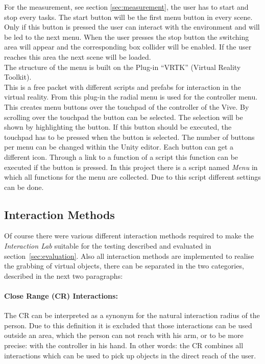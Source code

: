 For the measurement, see section \ref{sec:measurement}, the user has to start and stop every tasks. The start button will be the first menu button in every scene. Only if this button is pressed the user can interact with the environment and will be led to the next menu. When the user presses the stop button the switching area will appear and the corresponding box collider will be enabled. If the user reaches this area the next scene will be loaded.\\
The structure of the menu is built on the Plug-in ``VRTK'' (Virtual Reality Toolkit). \cite{asset_VRTK} \cite{VRTK}\\
This is a free packet with different scripts and prefabs for interaction in the virtual reality. From this plug-in the radial menu is used for the controller menu. This creates menu buttons over the touchpad of the controller of the Vive. By scrolling over the touchpad the button can be selected. The selection will be shown by highlighting the button. If this button should be executed, the touchpad has to be pressed when the button is selected. The number of buttons per menu can be changed within the Unity editor. Each button can get a different icon. Through a link to a function of a script this function can be executed if the button is pressed. In this project there is a script named \textit{Menu} in which all functions for the menu are collected. Due to this script different settings can be done. %


\subsection{Interaction Methods}\label{sec:Interactions}
Of course there were various different interaction methods required to make the \textit{Interaction Lab} suitable for the testing described and evaluated in section~\ref{sec:evaluation}. Also all interaction methods are implemented to realise the grabbing of virtual objects, there can be separated in the two categories, described in the next two paragraphs:

\paragraph{Close Range (CR) Interactions:} The CR can be interpreted as a synonym for the natural interaction radius of the person. Due to this definition it is excluded that those interactions can be used outside an area, which the person can not reach with his arm, or to be more precise: with the controller in his hand. In other words: the CR combines all interactions which can be used to pick up objects in the direct reach of the user.

